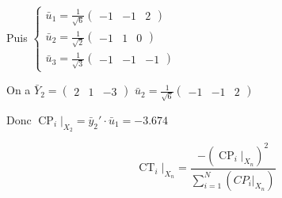 \documentclass{article}
\renewcommand{\overline}{\bar}
\begin{document}
	Puis $\begin{cases}
		\overline{u}_1 = \frac{1}{\sqrt{6} } \begin{pmatrix} -1 & -1 & 2 \end{pmatrix} \\
		\overline{u}_2 = \frac{1}{\sqrt{2} } \begin{pmatrix} -1 & 1 & 0 \end{pmatrix} 	\\
		\overline{u}_3 = \frac{1}{\sqrt{3} } \begin{pmatrix} -1 & -1 & -1 \end{pmatrix} 
	\end{cases}$

	On a $\overline{Y}_2 = \begin{pmatrix} 2 & 1 & -3 \end{pmatrix} $ 
	$\overline{u}_2 = \frac{1}{\sqrt{6} } \begin{pmatrix} -1 & -1 & 2 \end{pmatrix} $

	Donc $\operatorname{CP}_i |_{X_2} = \overline{y}_2'  \cdot \overline{u}_1 = -3.674 $

	\[
		\operatorname{CT}_i |_{X_n} = \frac{-(\operatorname{CP}_i |_{X_n})^2}{\sum_{i=1}^{N} (CP_i|_{X_n})}
	\] 
\end{document}
